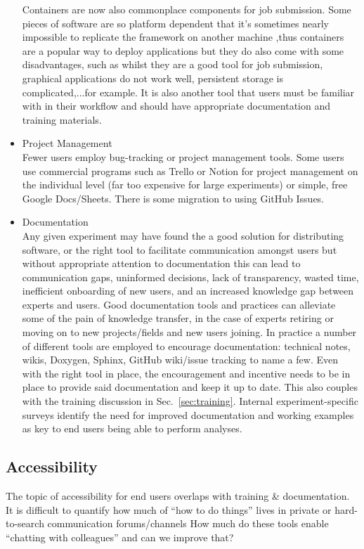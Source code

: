 \begin{itemize}
Containers are now also commonplace components for job submission. Some pieces of software are so platform dependent that it's sometimes nearly impossible to replicate the framework on another machine ,thus containers are a popular way to deploy applications but they do also come with some disadvantages, such as whilst they are a good tool for job submission, graphical applications do not work well, persistent storage is complicated,...for example. It is also another tool that users must be familiar with in their workflow and should have appropriate documentation and training materials.
  \item Project Management\\
Fewer users employ bug-tracking or project management tools. Some users use commercial programs such as Trello or Notion for project management on the individual level (far too expensive for large experiments) or simple, free Google Docs/Sheets. There is some migration to using GitHub Issues.
  \item Documentation\\
Any given experiment may have found the a good solution for distributing software, or the right tool to facilitate communication amongst users but without appropriate attention to documentation this can lead to communication gaps, uninformed decisions, lack of transparency, wasted time, inefficient onboarding of new users, and an increased knowledge gap between experts and users.  Good documentation tools and practices can alleviate some of the pain of knowledge transfer, in the case of experts retiring or moving on to new projects/fields and new users joining. In practice a number of different tools are employed to encourage documentation: technical notes, wikis, Doxygen, Sphinx, GitHub wiki/issue tracking to name a few. Even with the right tool in place, the encouragement and incentive needs to be in place to provide said documentation and keep it up to date. This also couples with the training discussion in Sec.~\ref{sec:training}. Internal experiment-specific surveys identify the need for improved documentation and working examples as key to end users being able to perform analyses.

\end{itemize}

\subsection{Accessibility}
The topic of accessibility for end users overlaps with training \& documentation. It is difficult to quantify how much of “how to do things” lives in private or hard-to-search communication forums/channels
How much do these tools enable “chatting with colleagues” and can we improve that?


